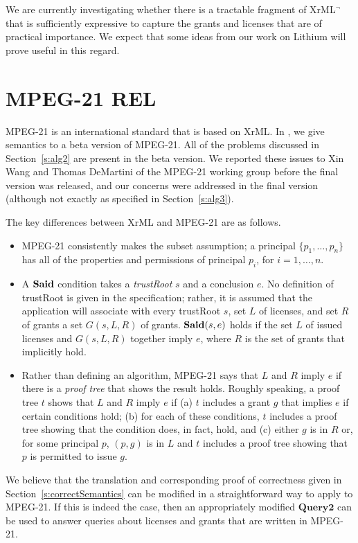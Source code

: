\documentclass{acmtrans2m}
\newcommand{\<}{
}
\renewcommand{\>}{\rangle}
\newcommand{\Said}{\mathit{\bf Said}}
\newcommand{\cc}{e}
\newcommand{\XProcTwo}{\textbf{Query2}}
\begin{document}
We are currently investigating whether there is a tractable fragment of XrML$^\neg$ that is sufficiently
expressive to capture the grants and licenses that are of practical importance.  We expect that some
ideas from our work on Lithium \cite{HW03} will prove useful in this regard.

\section{MPEG-21 REL}\label{s:MPEG-21}
MPEG-21 is an international standard that is based on XrML.  In \cite{HW04}, we give semantics to a beta
version of MPEG-21.  All of the problems discussed in Section~\ref{s:alg2} are present in the beta version.
We reported these issues to Xin Wang and Thomas DeMartini of the MPEG-21 working group before the final
version was released, and our concerns were addressed in the final version (although not exactly as
specified in Section~\ref{s:alg3}).

The key differences between XrML and MPEG-21 are as follows.
\begin{itemize}
\item MPEG-21
consistently makes the subset assumption;
a principal $\{p_1, \ldots, p_n\}$ has
all of the properties and permissions of principal $p_i$, for $i = 1, \ldots, n$.
\item A $\Said$ condition takes a \emph{trustRoot} $s$ and a conclusion $\cc$.  No definition of trustRoot
is given in the specification; rather, it is assumed that the application will associate with every
trustRoot $s$, set $L$ of licenses, and set $R$ of grants a set $G(s, L, R)$ of grants.  $\Said(s, \cc)$
holds if the set $L$ of issued licenses and $G(s, L, R)$ together imply $\cc$, where $R$ is the set of
grants that implicitly hold.
\item Rather than defining an algorithm, MPEG-21 says that $L$ and $R$ imply $\cc$ if there is a
\emph{proof tree} that shows the result holds.  Roughly speaking, a proof tree $t$ shows that $L$ and $R$
imply $\cc$ if (a) $t$ includes a grant $g$ that implies $\cc$ if certain conditions hold; (b) for each of
these conditions, $t$ includes a proof tree showing that the condition does, in fact, hold, and (c) either
$g$ is in $R$ or, for some principal $p$, $(p,g)$ is in $L$ and $t$ includes a proof tree showing that $p$
is permitted to issue $g$.
\end {itemize}
We believe that the translation and corresponding proof of correctness given in
Section~\ref{s:correctSemantics}
can be modified in a straightforward way to apply to MPEG-21.  If this is
indeed the case, then an appropriately modified $\XProcTwo$ can be used
to answer queries about licenses and
grants that are written in MPEG-21.
\end{document}
